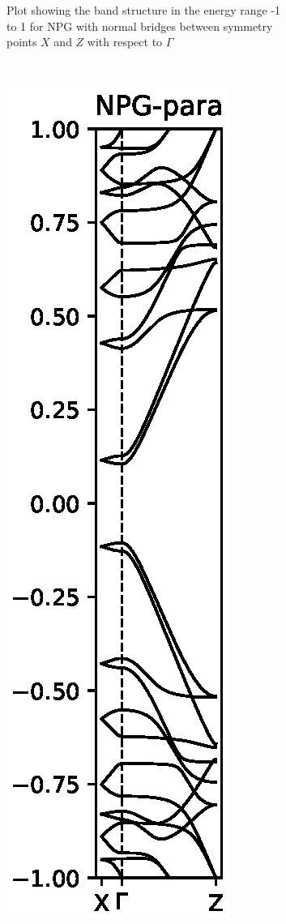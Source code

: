 \begin{figure}
\begin{subfigure}[b]{0.3\textwidth}
		\caption{Plot showing the band structure in the energy range -1 to 1 for NPG with normal bridges between symmetry points \(X\) and \(Z\) with respect to \(\Gamma\)}
		\label{Fabbs}
	\end{subfigure}
	~ %
	\begin{subfigure}[b]{0.3\textwidth}
		\includegraphics[width=\textwidth]{Figures/paraNPGBS.eps}

\end{subfigure}
\end{figure}
